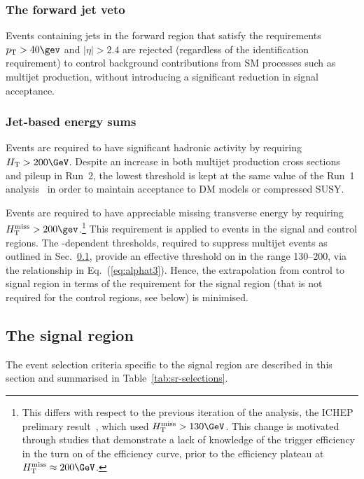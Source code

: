 \subsubsection{The forward jet veto} 

Events containing jets in the forward region that satisfy the
requirements $\Pt > 40\gev$ and $|\eta|>2.4$ are rejected (regardless
of the identification requirement) to control background contributions
from SM processes such as multijet production, without introducing a
significant reduction in signal acceptance.

\subsubsection{Jet-based energy sums}

Events are required to have significant hadronic activity by requiring
$\scalht > 200\GeV$. Despite an increase in both multijet production
cross sections and pileup in Run~2, the lowest \HT threshold is kept
at the same value of the Run~1 analysis~\cite{Chatrchyan:2013lya} in
order to maintain acceptance to DM models or compressed SUSY.

Events are required to have appreciable missing transverse energy by
requiring $\mht>200\gev$.\footnote{This differs with respect to the
  previous iteration of the analysis, the ICHEP prelimary
  result~\cite{CMS-PAS-SUS-16-016}, which used $\HTmiss >
  130\GeV$. This change is motivated through studies that demonstrate
  a lack of knowledge of the trigger efficiency in the turn on of the
  efficiency curve, prior to the efficiency plateau at $\HTmiss
  \approx 200\GeV$.}  This requirement is applied to events in the
signal and control regions. The \scalht-dependent \alphat thresholds,
required to suppress multijet events as outlined in
Sec.~\ref{sec:had-signal}, provide an effective threshold on \mht in
the range 130--200\GeV, via the relationship in
Eq.~(\ref{eq:alphat3}). Hence, the extrapolation from control to
signal region in terms of the \alphat requirement for the signal
region (that is not required for the control regions, see below) is
minimised.

\subsection{The signal region}
\label{sec:had-signal}

The event selection criteria specific to the signal region are
described in this section and summarised in
Table~\ref{tab:sr-selections}.

